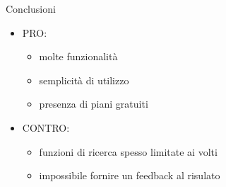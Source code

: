 %
\begin{frame}[t]{Conclusioni}
\begin{itemize}
	\item PRO:
	\begin{itemize}
		\item molte funzionalità
		\item semplicità di utilizzo
		\item presenza di piani gratuiti
	\end{itemize}
	\item CONTRO:
	\begin{itemize}
		\item funzioni di ricerca spesso limitate ai volti
		\item impossibile fornire un feedback al risulato
	\end{itemize}
\end{itemize}
\end{frame}
%
